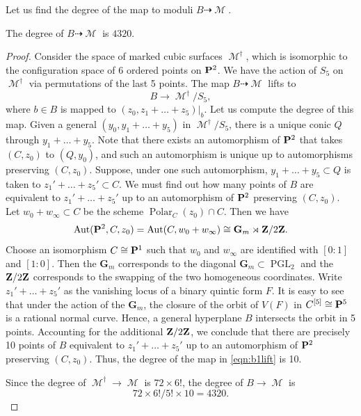 \documentclass[reqno]{amsart}
\DeclareMathOperator{\Polar}{Polar}
\DeclareMathOperator{\M}{\mathcal{M}}
\renewcommand{\to}{{\longrightarrow}}
\providecommand {\Z}{{\bf Z}}
\renewcommand {\P}{{\bf P}}
\providecommand{\PGL}{\operatorname{PGL}}
\providecommand{\Aut}{\operatorname{Aut}}
\numberwithin{equation}{section}
\newcommand{\G}{\mathbf{G}}
\begin{document}
Let us find the degree of the map to moduli $B \dashrightarrow \M$.
\begin{proposition}\label{lem:deg1}
  The degree of $B \dashrightarrow \M$ is $4320$.
\end{proposition}
\begin{proof}
  Consider the space of marked cubic surfaces $\M^{\dagger}$, which is isomorphic to the configuration space of 6 ordered points on $\P^2$.
  We have the action of $S_5$ on $\M^{\dagger}$ via permutations of the last 5 points.
  The map $B \dashrightarrow \M$ lifts to
  \begin{equation}\label{eqn:b1lift}
    B \to \M^{\dagger} / S_5,
  \end{equation}
  where $b \in B$ is mapped to $(z_0, z_1 + \dots + z_5)|_b$.
  Let us compute the degree of this map.
  Given a general $(y_0, y_1 + \dots + y_5)$ in $\M^{\dagger} / S_5$, there is a unique conic $Q$ through $y_1 + \dots + y_5$.
  Note that there exists an automorphism of $\P^2$ that takes $(C, z_0)$ to $(Q, y_0)$, and such an automorphism is unique up to automorphisms preserving $(C, z_0)$.
  Suppose, under one such automorphism, $y_1 + \dots + y_5 \subset Q$ is taken to $z_1' + \dots + z_5' \subset C$.
  We must find out how many points of $B$ are equivalent to $z_1' + \dots + z_5'$ up to an automorphism of $\P^2$ preserving $(C, z_0)$.
  Let $w_0 + w_{\infty} \subset C$ be the scheme $\Polar_C(z_0) \cap C$.
  Then we have
   \[\Aut(\P^2, C, z_0) = \Aut(C, w_0 + w_{\infty}) \cong \G_m \rtimes \Z/2\Z. \]
   Choose an isomorphism $C \cong \P^1$ such that $w_0$ and $w_{\infty}$ are identified with $[0:1]$ and $[1:0]$.
   Then the $\G_m$ corresponds to the diagonal $\G_m \subset \PGL_2$ and the $\Z/2\Z$ corresponds to the swapping of the two homogeneous coordinates.
   Write $z_1' + \dots + z_5'$ as the vanishing locus of a binary quintic form $F$.
   It is easy to see that under the action of the $\G_m$, the closure of the orbit of $V(F)$ in $C^{[5]} \cong \P^5$ is a rational normal curve.
   Hence, a general hyperplane $B$ intersects the orbit in 5 points.
   Accounting for the additional $\Z/2\Z$, we conclude that there are precisely 10 points of $B$ equivalent to $z_1' + \dots + z_5'$ up to an automorphism of $\P^2$ preserving $(C, z_0)$.
   Thus, the degree of the map in \eqref{eqn:b1lift} is 10.

   Since the degree of $\M^{\dagger} \to \M$ is $72 \times 6!$, the degree of $B \to \M$ is
   \[72 \times 6! / 5! \times 10 = 4320.\]
\end{proof}
\end{document}

